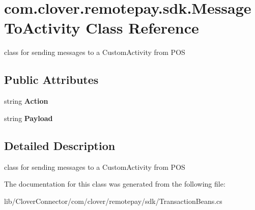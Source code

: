 \hypertarget{classcom_1_1clover_1_1remotepay_1_1sdk_1_1_message_to_activity}{}\section{com.\+clover.\+remotepay.\+sdk.\+Message\+To\+Activity Class Reference}
\label{classcom_1_1clover_1_1remotepay_1_1sdk_1_1_message_to_activity}


class for sending messages to a Custom\+Activity from P\+OS  


\subsection*{Public Attributes}
\begin{DoxyCompactItemize}
\item 
\mbox{\label{classcom_1_1clover_1_1remotepay_1_1sdk_1_1_message_to_activity_a7d5f7f85ec8ff64cbeb75d041d6d6a09}} 
string {\bfseries Action}
\item 
\mbox{\label{classcom_1_1clover_1_1remotepay_1_1sdk_1_1_message_to_activity_adb7eb4d199d215741e2184b04ec5e08e}} 
string {\bfseries Payload}
\end{DoxyCompactItemize}


\subsection{Detailed Description}
class for sending messages to a Custom\+Activity from P\+OS 



The documentation for this class was generated from the following file\+:\begin{DoxyCompactItemize}
\item 
lib/\+Clover\+Connector/com/clover/remotepay/sdk/Transaction\+Beans.\+cs\end{DoxyCompactItemize}

